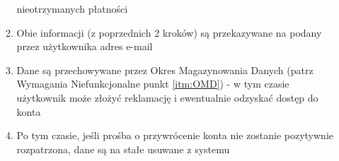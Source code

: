 \begin{enumerate}
\begin{enumerate}
    nieotrzymanych płatności
    \item Obie informacji (z poprzednich 2 kroków) są przekazywane na podany
    przez użytkownika adres e-mail
    \item Dane są przechowywane przez Okres Magazynowania Danych (patrz
    Wymagania Niefunkcjonalne punkt \ref{itm:OMD}) - w tym czasie użytkownik
    może złożyć reklamację i ewentualnie odzyskać dostęp do konta
    \item Po tym czasie, jeśli prośba o przywrócenie konta nie zostanie
    pozytywnie rozpatrzona, dane są na stałe usuwane z systemu
  \end{enumerate}
\end{enumerate}